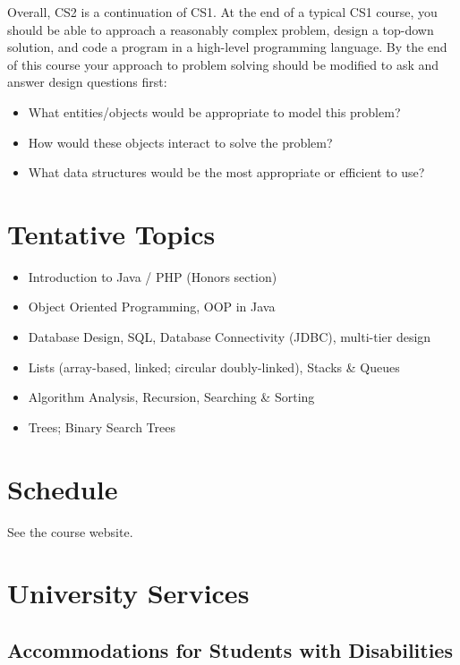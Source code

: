 \documentclass[12pt]{scrartcl}
\begin{document}
Overall, CS2 is a continuation of CS1.  At the end of a typical CS1 
course, you should be able to approach a reasonably complex problem, 
design a top-down solution, and code a program in a high-level 
programming language.  By the end of this course your approach to 
problem solving should be modified to ask and answer design questions 
first: 

\begin{itemize} 
  \item What entities/objects would be appropriate to model this problem?
  \item How would these objects interact to solve the problem?
  \item What data structures would be the most appropriate or efficient to use? 
\end{itemize}

\section{Tentative Topics}

\begin{itemize}
  \item Introduction to Java / PHP (Honors section)
  \item Object Oriented Programming, OOP in Java
  \item Database Design, SQL, Database Connectivity (JDBC), multi-tier design
  \item Lists (array-based, linked; circular doubly-linked), Stacks \& Queues
  \item Algorithm Analysis, Recursion, Searching \& Sorting
  \item Trees; Binary Search Trees
\end{itemize}

\section{Schedule}

See the course website.

\section{University Services}

\subsection{Accommodations for Students with Disabilities}
\end{document}
